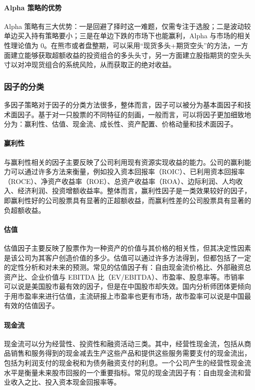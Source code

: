 \paragraph{Alpha 策略的优势} Alpha 策略有三大优势：一是回避了择时这一难题，仅需专注于选股；二是波动较单边买入持有策略要小；三是在单边下跌的市场下也能赢利，Alpha 与市场的相关性理论值为 0。在熊市或者盘整期，可以采用“现货多头+期货空头”的方法，一方面建立能够获取超额收益的投资组合的多头头寸，另一方面建立股指期货的空头头寸以对冲现货组合的系统风险，从而获取正的绝对收益。

\subsubsection{因子的分类}
多因子策略对于因子的分类方法很多，整体而言，因子可以被分为基本面因子和技术面因子。基于对一只股票的不同特征的刻画，一般而言，可以将因子更加细致地分为：赢利性、估值、现金流、成长性、资产配置、价格动量和技术面因子。

\paragraph{赢利性} 与赢利性相关的因子主要反映了公司利用现有资源实现收益的能力。公司的赢利能力可以通过许多方法来衡量，例如投入资本回报率（ROIC）、已利用资本回报率（ROCE）、净资产收益率（ROE）、总资产收益率（ROA）、边际利润、人均收入、经济利润、投资增额收益率。整体而言，赢利性因子是一类效果较好的因子，即赢利性好的公司股票具有显著的正超额收益，而赢利性差的公司股票具有显著的负超额收益。

\paragraph{估值} 估值因子主要反映了股票作为一种资产的价值与其价格的相关性，但其决定性因素是该公司为其客户创造价值的多少。估值可以通过许多方法得到，但都包括了一定的定性分析和对未来的预测。常见的估值因子有：自由现金流价格比、外部融资总资产比、企业价值与 EBITDA 比（EV/EBITDA）、市盈率、股息率等。市销率可以说是美国股市最有效的因子，但是在中国股市却失效。国内分析师团体更倾向于用市盈率来进行估值，主流研报上市盈率也更有市场，故市盈率可以说是中国最有效的估值因子。

\paragraph{现金流} 现金流可以分为经营性、投资性和融资活动三类。其中，经营性现金流，包括从商品销售和服务得到的现金减去生产这些产品和提供这些服务需要支付的现金流出，包括为利润支付的现金税和为债务融资支付的利息。一个公司产生的经营性现金流水平是衡量未来股市回报的一个重要指标。常见的现金流因子有：自由现金流和营业收入之比、投入资本现金回报率等。

